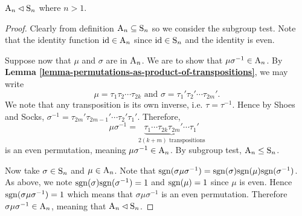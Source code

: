 \begin{proposition}\label{prop-An-normal-subgroup-of-Sn}
    $\mathrm{A}_{n} \lhd \mathrm{S}_{n}$ where $n > 1$.
\end{proposition}
\begin{proof}
    Clearly from definition $\mathrm{A}_{n} \subseteq \mathrm{S}_{n}$ so we consider the subgroup test. Note that the identity function $\mathrm{id} \in \mathrm{A}_{n}$ since $\mathrm{id} \in \mathrm{S}_{n}$ and the identity is even.

    Suppose now that $\mu$ and $\sigma$ are in $\mathrm{A}_{n}$. We are to show that $\mu\sigma^{-1} \in \mathrm{A}_{n}$. By \textbf{Lemma \ref{lemma-permutations-as-product-of-transpositions}}, we may write
    \[
        \mu = \tau_1\tau_2\cdots\tau_{2k} \text{ and } \sigma = \tau_1'\tau_2'\cdots\tau_{2m}'.
    \]
    We note that any transposition is its own inverse, i.e. $\tau = \tau^{-1}$. Hence by Shoes and Socks, $\sigma^{-1} = \tau_{2m}'\tau_{2m-1}'\cdots\tau_2'\tau_1'$. Therefore,
    \[
        \mu\sigma^{-1} = \underbrace{\tau_1\cdots\tau_{2k}\tau_{2m}'\cdots\tau_1'}_{2(k+m) \text{ transpositions}}
    \]
    is an even permutation, meaning $\mu\sigma^{-1} \in \mathrm{A}_{n}$. By subgroup test, $\mathrm{A}_{n} \leq \mathrm{S}_{n}$.
    
    Now take $\sigma \in \mathrm{S}_{n}$ and $\mu \in \mathrm{A}_{n}$. Note that $\mathrm{sgn}(\sigma\mu\sigma^{-1}) = \mathrm{sgn}(\sigma)\mathrm{sgn}(\mu)\mathrm{sgn}(\sigma^{-1})$. As above, we note $\mathrm{sgn}(\sigma)\mathrm{sgn}(\sigma^{-1}) = 1$ and $\mathrm{sgn}(\mu) = 1$ since $\mu$ is even. Hence $\mathrm{sgn}(\sigma\mu\sigma^{-1}) = 1$ which means that $\sigma\mu\sigma^{-1}$ is an even permutation. Therefore $\sigma\mu\sigma^{-1} \in \mathrm{A}_{n}$, meaning that $\mathrm{A}_{n} \lhd \mathrm{S}_{n}$.
\end{proof}

